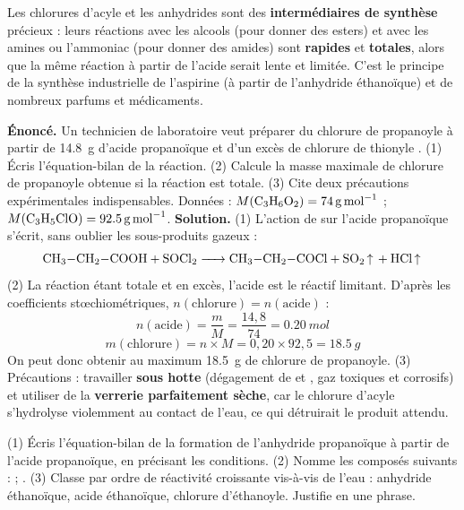 \documentclass[11pt]{article}
\begin{document}
\begin{aretenir}
Les chlorures d'acyle et les anhydrides sont des \textbf{intermédiaires de synthèse} précieux : leurs réactions avec les alcools (pour donner des esters) et avec les amines ou l'ammoniac (pour donner des amides) sont \textbf{rapides} et \textbf{totales}, alors que la même réaction à partir de l'acide serait lente et limitée. C'est le principe de la synthèse industrielle de l'aspirine (à partir de l'anhydride éthanoïque) et de nombreux parfums et médicaments.
\end{aretenir}

\begin{exoresolu}
\textbf{Énoncé.} Un technicien de laboratoire veut préparer du chlorure de propanoyle  à partir de \SI{14,8}{g} d'acide propanoïque et d'un excès de chlorure de thionyle . (1) Écris l'équation-bilan de la réaction. (2) Calcule la masse maximale de chlorure de propanoyle obtenue si la réaction est totale. (3) Cite deux précautions expérimentales indispensables. Données : $M(\ce{C3H6O2}) = \SI{74}{g.mol^{-1}}$ ; $M(\ce{C3H5ClO}) = \SI{92,5}{g.mol^{-1}}$.
\tcblower
\textbf{Solution.} (1) L'action de  sur l'acide propanoïque s'écrit, sans oublier les sous-produits gazeux :
\[ \ce{CH3-CH2-COOH + SOCl2 -> CH3-CH2-COCl + SO2 ^ + HCl ^} \]
(2) La réaction étant totale et  en excès, l'acide est le réactif limitant. D'après les coefficients stœchiométriques, $n(\text{chlorure}) = n(\text{acide})$ :
\[ n(\text{acide}) = \frac{m}{M} = \frac{14,8}{74} = \SI{0,20}{mol} \]
\[ m(\text{chlorure}) = n \times M = 0,20 \times 92,5 = \SI{18,5}{g} \]
On peut donc obtenir au maximum \SI{18,5}{g} de chlorure de propanoyle.
(3) Précautions : travailler \textbf{sous hotte} (dégagement de  et , gaz toxiques et corrosifs) et utiliser de la \textbf{verrerie parfaitement sèche}, car le chlorure d'acyle s'hydrolyse violemment au contact de l'eau, ce qui détruirait le produit attendu.
\end{exoresolu}

\begin{exercice}
(1) Écris l'équation-bilan de la formation de l'anhydride propanoïque à partir de l'acide propanoïque, en précisant les conditions. (2) Nomme les composés suivants :  ; . (3) Classe par ordre de réactivité croissante vis-à-vis de l'eau : anhydride éthanoïque, acide éthanoïque, chlorure d'éthanoyle. Justifie en une phrase.
\end{exercice}
\end{document}
